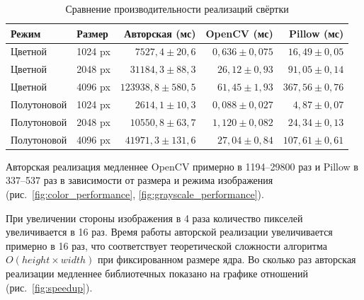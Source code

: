 \documentclass[a4paper]{article}
\begin{document}
\begin{table}[h]

\centering

\caption{Сравнение производительности реализаций свёртки}

\label{tab:performance}

\begin{tabular}{llrrr}

    \toprule

    \textbf{Режим} & \textbf{Размер} & \textbf{Авторская (мс)} & \textbf{OpenCV (мс)} & \textbf{Pillow (мс)} \\

    \midrule

    Цветной & 1024 px & $7527{,}4 \pm 20{,}6$ & $0{,}636 \pm 0{,}075$ & $16{,}49 \pm 0{,}05$ \\

    Цветной & 2048 px & $31184{,}3 \pm 88{,}3$ & $26{,}12 \pm 0{,}93$ & $91{,}05 \pm 0{,}14$ \\

    Цветной & 4096 px & $123938{,}8 \pm 580{,}5$ & $61{,}45 \pm 1{,}93$ & $367{,}56 \pm 0{,}76$ \\

    Полутоновой & 1024 px & $2614{,}1 \pm 10{,}3$ & $0{,}088 \pm 0{,}027$ & $4{,}87 \pm 0{,}07$ \\

    Полутоновой & 2048 px & $10550{,}8 \pm 63{,}7$ & $1{,}120 \pm 0{,}082$ & $24{,}34 \pm 0{,}13$ \\

    Полутоновой & 4096 px & $41971{,}3 \pm 131{,}6$ & $27{,}04 \pm 0{,}84$ & $107{,}61 \pm 0{,}61$ \\

    \bottomrule

\end{tabular}

\end{table}

Авторская реализация медленнее OpenCV примерно в 1194--29800 раз и Pillow в 337--537 раз в зависимости от размера и режима изображения (рис.~\ref{fig:color_performance}, \ref{fig:grayscale_performance}).

При увеличении стороны изображения в 4 раза количество пикселей увеличивается в 16 раз. Время работы авторской реализации увеличивается примерно в 16 раз, что соответствует теоретической сложности алгоритма $O(height\times width)$ при фиксированном размере ядра. Во сколько раз авторская реализации медленнее библиотечных показано на графике отношений (рис.~\ref{fig:speedup}).
\end{document}
